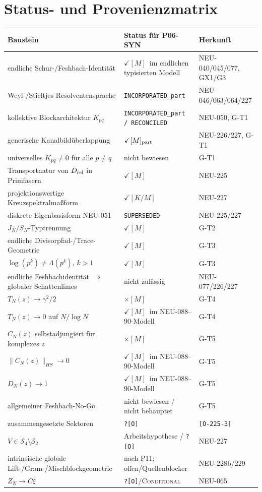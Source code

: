 \documentclass[11pt,a4paper]{amsart}
\newcommand{\stM}{\ensuremath{\checkmark[M]}}
\newcommand{\stKM}{\ensuremath{\checkmark[K/M]}}
\newcommand{\stMpart}{\ensuremath{\checkmark[M]_{\rm part}}}
\newcommand{\Open}{\texttt{?[O]}}
\newcommand{\Conditional}{\textnormal{\textsc{Conditional}}}
\begin{document}
\section{Status- und Provenienzmatrix}

\renewcommand{\arraystretch}{1.15}
\begin{longtable}{>{\raggedright\arraybackslash}p{}
                  >{\raggedright\arraybackslash}p{}
                  >{\raggedright\arraybackslash}p{}}
\toprule
Baustein & Status für P06-SYN & Herkunft \\
\midrule
\endhead
endliche Schur-/Feshbach-Identität & \stM\ im endlichen typisierten Modell & NEU-040/045/077, GX1/G3 \\
Weyl-/Stieltjes-Resolventensprache & \texttt{INCORPORATED\_part} & NEU-046/063/064/227 \\
kollektive Blockarchitektur $K_{pq}$ & \texttt{INCORPORATED\_part / RECONCILED} & NEU-050, G-T1 \\
generische Kanalbildüberlappung & \stMpart & NEU-226/227, G-T1 \\
universelles $K_{pq}\ne0$ für alle $p\ne q$ & nicht bewiesen & G-T1 \\
Transportnatur von $D_{\rm rel}$ in Primfasern & \stM & NEU-225 \\
projektionswertige Kreuzspektralmaßform & \stKM & NEU-227 \\
diskrete Eigenbasisform NEU-051 & \texttt{SUPERSEDED} & NEU-225/227 \\
$J_N^-/S_N$-Typtrennung & \stM & G-T2 \\
endliche Divisorpfad-/Trace-Geometrie & \stM & G-T3 \\
$\log(p^k)\ne\Lambda(p^k)$, $k>1$ & \stM & G-T3 \\
endliche Feshbachidentität $\Rightarrow$ globaler Schattenlimes & nicht zulässig & NEU-077/226/227 \\
$T_N(z)\to\gamma^2/2$ & $\times[M]$ & G-T4 \\
$T_N(z)\to0$ auf $N/\log N$ & \stM\ im NEU-088--90-Modell & G-T4 \\
$C_N(z)$ selbstadjungiert für komplexes $z$ & $\times[M]$ & G-T5 \\
$\|C_N(z)\|_{HS}\to0$ & \stM\ im NEU-088--90-Modell & G-T5 \\
$D_N(z)\to1$ & \stM\ im NEU-088--90-Modell & G-T5 \\
allgemeiner Feshbach-No-Go & nicht bewiesen / nicht behauptet & G-T5 \\
zusammengesetzte Sektoren & \Open & \texttt{[O-225-3]} \\
$V\in\mathcal S_4\setminus\mathcal S_2$ & Arbeitshypothese / \Open & NEU-227 \\
intrinsische globale Lift-/Gram-/Mischblockgeometrie & nach P11; offen/Quellenblocker & NEU-228b/229 \\
$Z_N\to C\xi$ & \Open/\Conditional & NEU-065 \\
\bottomrule
\end{longtable}
\end{document}
